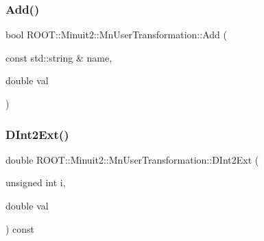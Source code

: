 \subsubsection{\texorpdfstring{Add()}{Add()}\hspace{0.1cm}{\footnotesize\ttfamily [6/6]}}
{\footnotesize\ttfamily bool R\+O\+O\+T\+::\+Minuit2\+::\+Mn\+User\+Transformation\+::\+Add (\begin{DoxyParamCaption}\item[{const std\+::string \&}]{name,  }\item[{double}]{val }\end{DoxyParamCaption})}

\mbox{\label{classROOT_1_1Minuit2_1_1MnUserTransformation_a35938acd16a546d398ce1c00ffc98c44}} 
\subsubsection{\texorpdfstring{DInt2Ext()}{DInt2Ext()}\hspace{0.1cm}{\footnotesize\ttfamily [1/2]}}
{\footnotesize\ttfamily double R\+O\+O\+T\+::\+Minuit2\+::\+Mn\+User\+Transformation\+::\+D\+Int2\+Ext (\begin{DoxyParamCaption}\item[{unsigned int}]{i,  }\item[{double}]{val }\end{DoxyParamCaption}) const}

